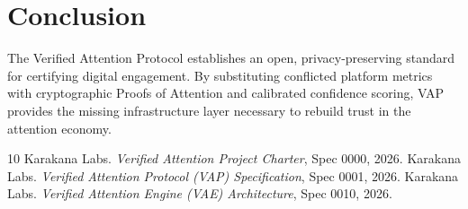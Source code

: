 \documentclass[10pt,twocolumn,letterpaper]{article}
\begin{document}
\section{Conclusion}
The Verified Attention Protocol establishes an open, privacy-preserving standard for certifying digital engagement. By substituting conflicted platform metrics with cryptographic Proofs of Attention and calibrated confidence scoring, VAP provides the missing infrastructure layer necessary to rebuild trust in the attention economy.


\begin{thebibliography}{10}
Karakana Labs.
\newblock \emph{Verified Attention Project Charter}, Spec 0000, 2026.
Karakana Labs.
\newblock \emph{Verified Attention Protocol (VAP) Specification}, Spec 0001, 2026.
Karakana Labs.
\newblock \emph{Verified Attention Engine (VAE) Architecture}, Spec 0010, 2026.
\end{thebibliography}
\end{document}

